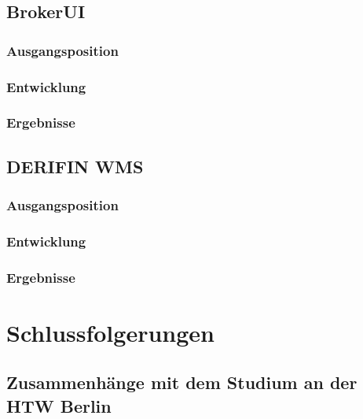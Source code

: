 \documentclass[chapterprefix=false, 12pt, a4paper, oneside, parskip=half, listof=totoc, bibliography=totoc, numbers=noendperiod]{scrbook}
\begin{document}
    \section{BrokerUI}

    \subsection{Ausgangsposition}

    \subsection{Entwicklung}

    \subsection{Ergebnisse}

    \section{DERIFIN WMS}

    \subsection{Ausgangsposition}

    \subsection{Entwicklung}

    \subsection{Ergebnisse}

    \chapter{Schlussfolgerungen}

    \section{Zusammenhänge mit dem Studium an der HTW Berlin}
\end{document}
